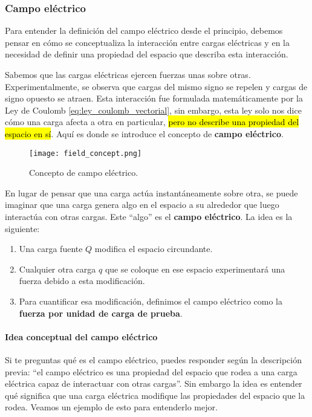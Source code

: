 \subsubsection{Campo eléctrico}

Para entender la definición del campo eléctrico desde el principio, debemos pensar en cómo se conceptualiza la interacción entre cargas eléctricas y en la necesidad de definir una propiedad del espacio que describa esta interacción.

Sabemos que las cargas eléctricas ejercen fuerzas unas sobre otras. Experimentalmente, se observa que cargas del mismo signo se repelen y cargas de signo opuesto se atraen. Esta interacción fue formulada matemáticamente por la Ley de Coulomb \eqref{eq:ley_coulomb_vectorial}, sin embargo, esta ley solo nos dice cómo una carga afecta a otra en particular, \hl{pero no describe una propiedad del espacio en sí}. Aquí es donde se introduce el concepto de \textbf{campo eléctrico}.

\begin{figure}[ht]
    \centering
    \texttt{[image: field\_concept.png]}
    \caption{Concepto de campo eléctrico.}
    \label{fig:concepto_campo_electrico}
\end{figure}

En lugar de pensar que una carga actúa instantáneamente sobre otra, se puede imaginar que una carga genera algo en el espacio a su alrededor que luego interactúa con otras cargas. Este ``algo'' es el \textbf{campo eléctrico}. La idea es la siguiente:

\begin{enumerate}
    \item Una carga fuente \( Q \) modifica el espacio circundante.
    \item Cualquier otra carga \( q \) que se coloque en ese espacio experimentará una fuerza debido a esta modificación.
    \item Para cuantificar esa modificación, definimos el campo eléctrico como la \textbf{fuerza por unidad de carga de prueba}.
\end{enumerate}

\paragraph{Idea conceptual del campo eléctrico}

Si te preguntas qué es el campo eléctrico, puedes responder según la descripción previa: ``el campo eléctrico es una propiedad del espacio que rodea a una carga eléctrica capaz de interactuar con otras cargas''. Sin embargo la idea es entender qué significa que una carga eléctrica modifique las propiedades del espacio que la rodea. Veamos un ejemplo de esto para entenderlo mejor.

